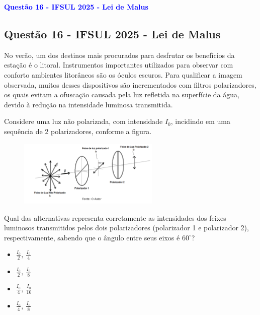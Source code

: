 \begin{flushleft}
\textbf{\textcolor{blue}{\Large Quest\~ao 16 - IFSUL 2025 - Lei de Malus}}\\
\noindent

\subsection{Quest\~ao 16 - IFSUL 2025 - Lei de Malus}

No ver\~ao, um dos destinos mais procurados para desfrutar os benef\'icios da esta\c{c}\~ao \'e o litoral. 
Instrumentos importantes utilizados para observar com conforto ambientes litor\^aneos s\~ao os \'oculos escuros. 
Para qualificar a imagem observada, muitos desses dispositivos s\~ao incrementados com filtros polarizadores, 
os quais evitam a ofusca\c{c}\~ao causada pela luz refletida na superf\'icie da \'agua, devido \`a redu\c{c}\~ao na intensidade luminosa transmitida.  

Considere uma luz n\~ao polarizada, com intensidade \(I_0\), incidindo em uma sequ\^encia de 2 polarizadores, conforme a figura. 

\begin{figure}
\centering
\includegraphics[width=0.6\textwidth]{figures/lei_de_malus.png}
\end{figure}

Qual das alternativas representa corretamente as intensidades dos feixes luminosos transmitidos pelos dois polarizadores (polarizador 1 e polarizador 2), respectivamente, sabendo que o \^angulo entre seus eixos \'e \(60^\circ\)?  

\begin{itemize}
\item[(a)] \(\tfrac{I_0}{2},\ \tfrac{I_0}{4}\)
\item[(b)] \(\tfrac{I_0}{2},\ \tfrac{I_0}{8}\)
\item[(c)] \(\tfrac{I_0}{4},\ \tfrac{I_0}{16}\)
\item[(d)] \(\tfrac{I_0}{4},\ \tfrac{I_0}{8}\)
\end{itemize}

\vspace{0.5cm}


\end{flushleft}
